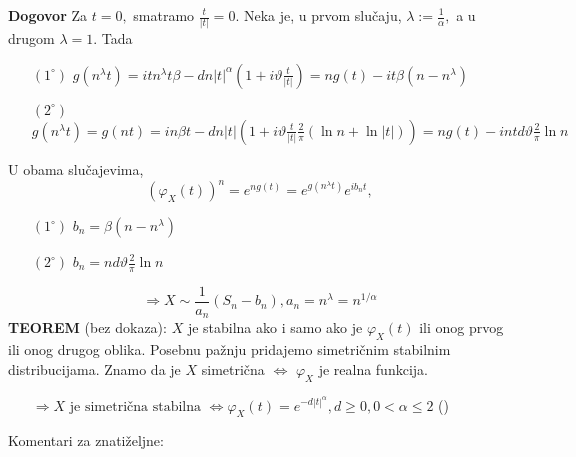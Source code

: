 \documentclass{article}
\begin{document}
\textbf{Dogovor} Za \(t=0,\) smatramo \(\frac{t}{|t|}=0.\)\newline
Neka je, u prvom slučaju, \(\lambda:=\frac1\alpha,\) a u drugom \(\lambda=1.\) Tada
\begin{enumerate}
    \item[\((1^\circ)\)] \(g\left(n^\lambda t\right)=itn^\lambda t\beta-dn|t|^\alpha\left(1+i\vartheta\frac{t}{|t|}\right)=ng(t)-it\beta\left(n-n^\lambda\right)\)
    \item[\((2^\circ)\)] \(g\left(n^\lambda t\right)=g(nt)=in\beta t-dn|t|\left(1+i\vartheta\frac{t}{|t|}\frac2\pi\left(\ln n+\ln|t|\right)\right)=ng(t)-intd\vartheta\frac2\pi\ln n\)
\end{enumerate} 
U obama slučajevima, \[\left(\varphi_X(t)\right)^n=e^{ng(t)}=e^{g\left(n^\lambda t\right)}e^{ib_nt},\]
\begin{enumerate}
    \item[\((1^\circ)\)] \(b_n=\beta\left(n-n^\lambda\right)\)
    \item[\((2^\circ)\)] \(b_n=nd\vartheta\frac2\pi\ln n\)
\end{enumerate} \[\Rightarrow X\sim\frac1{a_n}(S_n-b_n),a_n=n^\lambda=n^{1/\alpha}\]
\textbf{TEOREM} (bez dokaza):\newline
\(X\) je stabilna ako i samo ako je \(\varphi_X(t)\) ili onog prvog ili onog drugog oblika.\newline\newline
Posebnu pažnju pridajemo simetričnim stabilnim distribucijama. Znamo da je \(X\) simetrična \(\Leftrightarrow\) \(\varphi_X\) je realna funkcija.
\begin{enumerate}
    \item[]\(\Rightarrow X\text{ je simetrična stabilna }\Leftrightarrow\varphi_X(t)=e^{-d|t|^\alpha},d\ge0,0<\alpha\le 2\) \hypertarget{simstab}{()}
\end{enumerate}
Komentari za znatiželjne:
\end{document}
